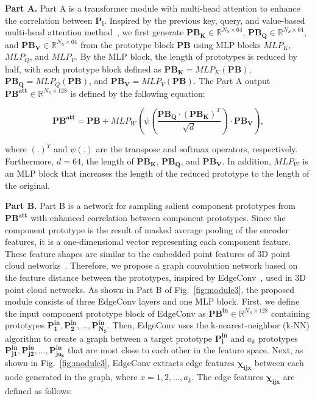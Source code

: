 \documentclass[runningheads]{llncs}
\begin{document}
	\noindent
	\textbf{Part A.} Part A is a transformer module with multi-head attention to enhance the correlation between $\mathbf{P _ { i }}$. Inspired by the previous key, query, and value-based multi-head attention method~\cite{wang2018non,fu2019dual,zhang2019self}, we first generate $\mathbf{PB_K} \in \mathbb{R} ^ {N_S \times 64}$, $\mathbf{PB_Q} \in \mathbb{R} ^ {N_S \times 64}$, and $\mathbf{PB_V} \in \mathbb{R} ^ {N_S \times 64}$ from the prototype block $\mathbf{PB}$ using MLP blocks $MLP _ { K }$, $MLP _ { Q }$, and $MLP _ { V }$. By the MLP block, the length of prototypes is reduced by half, with each prototype block defined as $\mathbf{PB _ { K }} =MLP _ { K } \left ( \mathbf{PB} \right )$, $\mathbf{PB _ { Q }} =MLP _ { Q } \left ( \mathbf{PB} \right )$, and $\mathbf{PB _ { V }} =MLP _ { V } \left ( \mathbf{PB} \right )$. The Part A output $\mathbf{PB ^ { att }} \in \mathbb{R} ^ {N_S \times 128}$ is defined by the following equation:
	
	\begin{equation}
		\mathbf{PB ^ { att }} = \mathbf{PB} + MLP _ { W } \left ( \psi \left ( \frac{\mathbf{PB_Q} \cdot \left ( \mathbf{PB_K} \right ) ^ { T } } { \sqrt { d } } \right ) \cdot \mathbf{PB_V} \right ),
	\end{equation}
	
	\noindent
	where $\left ( . \right ) ^ { T }$ and $\psi \left ( . \right )$ are the transpose and softmax operators, respectively. Furthermore, $d = 64$, the length of $\mathbf{PB_K}$, $\mathbf{PB_Q}$, and $\mathbf{PB_V}$. In addition, $MLP _ { W }$ is an MLP block that increases the length of the reduced prototype to the length of the original.
	
	\noindent
	\textbf{Part B.} Part B is a network for sampling salient component prototypes from $\mathbf{PB ^ { att }}$ with enhanced correlation between component prototypes. Since the component prototype is the result of masked average pooling of the encoder features, it is a one-dimensional vector representing each component feature. These feature shapes are similar to the embedded point features of 3D point cloud networks~\cite{qi2017pointnet,qi2017pointnet++,wang2019dynamic}. Therefore, we propose a graph convolution network based on the feature distance between the prototypes, inspired by EdgeConv~\cite{wang2019dynamic}, used in 3D point cloud networks. As shown in Part B of Fig.~\ref{fig:module3}, the proposed module consists of three EdgeConv layers and one MLP block. First, we define the input component prototype block of EdgeConv as $\mathbf{PB^{in}} \in \mathbb{R} ^ {N_S \times 128}$ containing prototypes $\mathbf{P_{1}^{in}}, \mathbf{P_{2}^{in}}, ..., \mathbf{P_{N_S}^{in}}$. Then, EdgeConv uses the k-nearest-neighbor (k-NN) algorithm to create a graph between a target prototype $\mathbf{P_i^{in}}$ and $a_k$ prototypes $\mathbf{P_{j1}^{in}}, \mathbf{P_{j2}^{in}}, ..., \mathbf{P_{ja_k}^{in}}$ that are most close to each other in the feature space. Next, as shown in Fig.~\ref{fig:module3}, EdgeConv extracts edge features $\mathbf{\chi _ { ijx }}$ between each node generated in the graph, where $x = 1, 2, ..., a_k$. The edge features $\mathbf{\chi _ { ijx }}$ are defined as follows:
	
\end{document}
